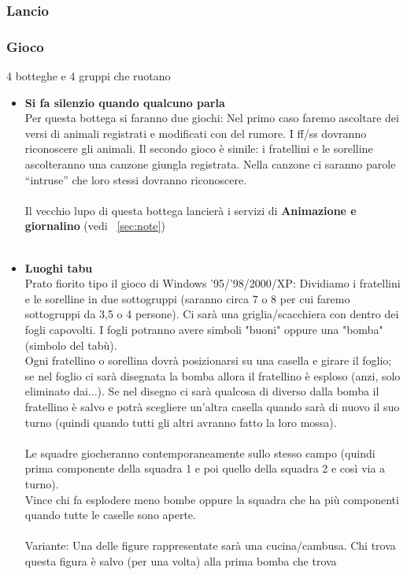 \documentclass[../main.tex]{subfiles}
\begin{document}
       \subsubsection{Lancio}
        \subsubsection{Gioco}
        4 botteghe e 4 gruppi che ruotano
        
        \begin{itemize}
            \item   \textbf{Si fa silenzio quando qualcuno parla}\\
                    Per questa bottega si faranno due giochi: Nel primo caso faremo ascoltare dei versi di animali registrati e modificati con del rumore. I ff/ss dovranno riconoscere gli animali.
Il secondo gioco è simile: i fratellini e le sorelline ascolteranno una canzone giungla registrata. Nella canzone ci saranno parole “intruse” che loro stessi dovranno riconoscere.\\
            \\
            Il vecchio lupo di questa bottega lancierà i servizi di \textbf{Animazione e giornalino} (vedi ~\ref{sec:note})\\
            \\
            \item  \textbf{Luoghi tabu}\\
            Prato fiorito tipo il gioco di Windows '95/'98/2000/XP:
            Dividiamo i fratellini e le sorelline in due sottogruppi (saranno circa 7 o 8 per cui faremo sottogruppi da 3,5 o 4 persone).
            Ci sarà una griglia/scacchiera con dentro dei fogli capovolti. I fogli potranno avere simboli "buoni" oppure una "bomba" (simbolo del tabù).\\Ogni fratellino o sorellina dovrà posizionarsi su una casella e girare il foglio; se nel foglio ci sarà disegnata la bomba allora il fratellino è esploso (anzi, solo eliminato dai...). Se nel disegno ci sarà qualcosa di diverso dalla bomba il fratellino è salvo e potrà scegliere un'altra casella quando sarà di nuovo il suo turno (quindi quando tutti gli altri avranno fatto la loro mossa).\\
            \\
            Le squadre giocheranno contemporaneamente sullo stesso campo (quindi prima componente della squadra 1 e poi quello della squadra 2 e così via a turno).\\
            Vince chi fa esplodere meno bombe oppure la squadra che ha più componenti quando tutte le caselle sono aperte.\\
            \\
            Variante: Una delle figure rappresentate sarà una cucina/cambusa. Chi trova questa figura è salvo (per una volta) alla prima bomba che trova
            

\end{itemize}
\end{document}
